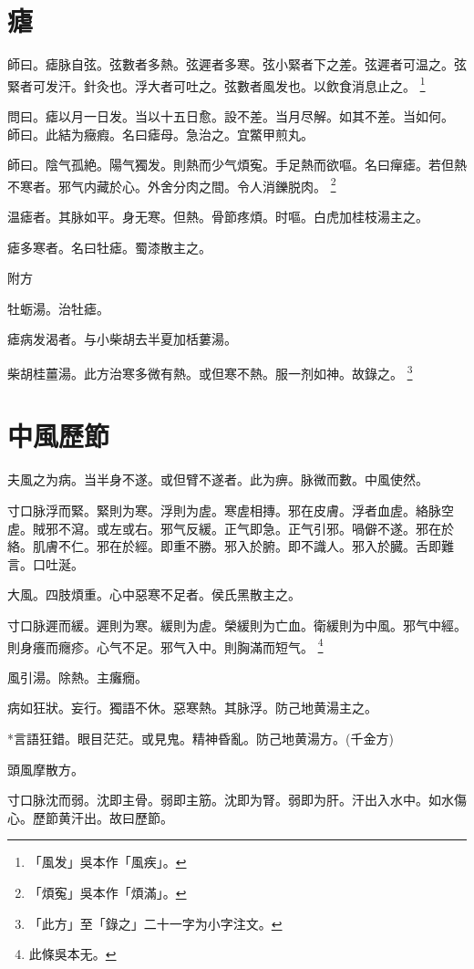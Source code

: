 \documentclass[b5paper,twoside,zihao=-4,UTF8]{ctexbook}
\begin{document}
\chapter{瘧}

師曰。瘧脉自弦。弦數者多熱。弦遲者多寒。弦小緊者下之差。弦遲者可温之。弦緊者可发汗。針灸也。浮大者可吐之。弦數者風发也。以飲食消息止之。
	\footnote{「風发」吳本作「風疾」。}

問曰。瘧以月一日发。当以十五日愈。設不差。当月尽解。如其不差。当如何。\\
師曰。此結为癥瘕。名曰瘧母。急治之。宜鱉甲煎丸。

師曰。陰气孤絶。陽气獨发。則熱而少气煩寃。手足熱而欲嘔。名曰癉瘧。若但熱不寒者。邪气内藏於心。外舍分肉之間。令人消鑠脱肉。
	\footnote{「煩寃」吳本作「煩滿」。}

温瘧者。其脉如平。身无寒。但熱。骨節疼煩。时嘔。白虎加桂枝湯主之。

瘧多寒者。名曰牡瘧。蜀漆散主之。

附方

牡蛎湯。治牡瘧。

瘧病发渴者。与小柴胡去半夏加栝蔞湯。

柴胡桂薑湯。此方治寒多微有熱。或但寒不熱。服一剂如神。故錄之。
	\footnote{「此方」至「錄之」二十一字为小字注文。}

\chapter{中風歷節}

夫風之为病。当半身不遂。或但臂不遂者。此为痹。脉微而數。中風使然。

寸口脉浮而緊。緊則为寒。浮則为虗。寒虗相摶。邪在皮膚。浮者血虗。絡脉空虗。賊邪不瀉。或左或右。邪气反緩。正气即急。正气引邪。喎僻不遂。邪在於絡。肌膚不仁。邪在於經。即重不勝。邪入於腑。即不識人。邪入於臓。舌即難言。口吐涎。

大風。四肢煩重。心中惡寒不足者。侯氏黑散主之。

寸口脉遲而緩。遲則为寒。緩則为虗。榮緩則为亡血。衛緩則为中風。邪气中經。則身癢而癮疹。心气不足。邪气入中。則胸滿而短气。
	\footnote{此條吳本无。}

風引湯。除熱。主癱癇。

病如狂狀。妄行。獨語不休。惡寒熱。其脉浮。防己地黄湯主之。

*言語狂錯。眼目茫茫。或見鬼。精神昏亂。防己地黄湯方。(千金方)

頭風摩散方。

寸口脉沈而弱。沈即主骨。弱即主筋。沈即为腎。弱即为肝。汗出入水中。如水傷心。歷節黄汗出。故曰歷節。
\end{document}
